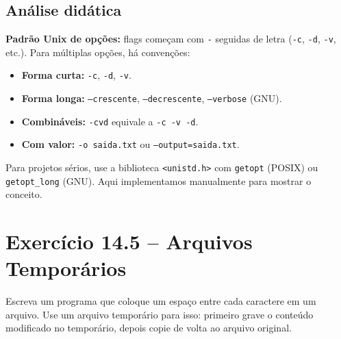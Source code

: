 \documentclass[12pt,a4paper]{article}
\begin{document}
\subsection*{Análise didática}

\begin{boaprática}
\textbf{Padrão Unix de opções:} flags começam com \texttt{-} seguidas de letra
(\texttt{-c}, \texttt{-d}, \texttt{-v}, etc.). Para múltiplas opções, há
convenções:

\begin{itemize}[noitemsep]
  \item \textbf{Forma curta:} \texttt{-c}, \texttt{-d}, \texttt{-v}.
  \item \textbf{Forma longa:} \texttt{--crescente}, \texttt{--decrescente},
  \texttt{--verbose} (GNU).
  \item \textbf{Combináveis:} \texttt{-cvd} equivale a \texttt{-c -v -d}.
  \item \textbf{Com valor:} \texttt{-o saida.txt} ou \texttt{--output=saida.txt}.
\end{itemize}

Para projetos sérios, use a biblioteca \texttt{<unistd.h>} com \texttt{getopt}
(POSIX) ou \texttt{getopt\_long} (GNU). Aqui implementamos manualmente para
mostrar o conceito.
\end{boaprática}

\newpage

\section{Exercício 14.5 -- Arquivos Temporários}

\begin{enunciadoBox}[Enunciado 14.5]
Escreva um programa que coloque um espaço entre cada caractere em um arquivo.
Use um arquivo temporário para isso: primeiro grave o conteúdo modificado no
temporário, depois copie de volta ao arquivo original.
\end{enunciadoBox}
\end{document}
